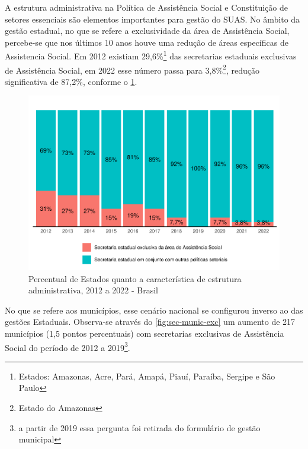 \documentclass[
  brazilian]{report}
\begin{document}
A estrutura administrativa na Política de Assistência Social e
Constituição de setores essenciais são elementos importantes para gestão
do SUAS. No âmbito da gestão estadual, no que se refere a exclusividade
da área de Assistência Social, percebe-se que nos últimos 10 anos houve
uma redução de áreas específicas de Assistencia Social. Em 2012 existiam
29,6\%\footnote{Estados: Amazonas, Acre, Pará, Amapá, Piauí, Paraíba, Sergipe e São Paulo}
das secretarias estaduais exclusivas de Assistência Social, em 2022 esse
número passa para 3,8\%\footnote{Estado do Amazonas}, redução
significativa de 87,2\%, conforme o \cref{fig:estados_sec_exc}.

\begin{figure}
\includegraphics{Censo-SUAS-2022_files/figure-latex/estados_sec_exc-1} \caption[Percentual de Estados quanto a característica de estrutura administrativa, 2012 a 2022 - Brasil]{Percentual de Estados quanto a característica de estrutura administrativa, 2012 a 2022 - Brasil}\label{fig:estados_sec_exc}
\end{figure}

No que se refere aos municípios, esse cenário nacional se configurou
inverso ao das gestões Estaduais. Observa-se através do
\cref{fig:sec-munic-exc} um aumento de 217 municípios (1,5 pontos
percentuais) com secretarias exclusivas de Assistência Social do período
de 2012 a
2019\footnote{a partir de 2019 essa pergunta foi retirada do formulário de gestão municipal}.
\end{document}
